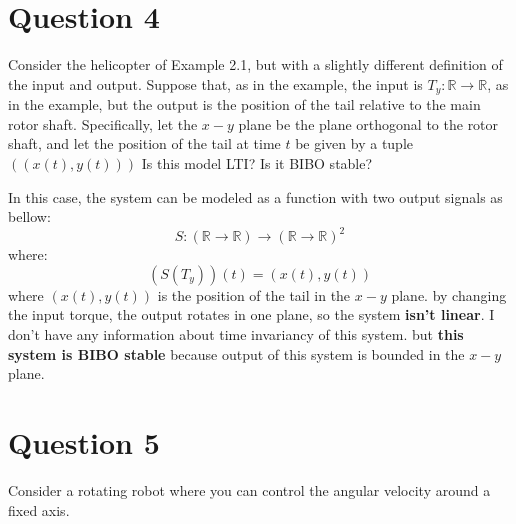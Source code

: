 \documentclass[12pt]{article}
\begin{document}
\vfil
\clearpage












\section{Question 4}
Consider the helicopter of Example 2.1, but with a slightly different definition of
the input and output. Suppose that, as in the example, the input is $T_y: \mathbb{R} \rightarrow \mathbb{R}$, as in the example, but the output is the position of the tail relative to the main rotor shaft. Specifically, let the $x-y$ plane be the plane orthogonal to the rotor shaft, and let the position of the tail at time $t$ be given by a tuple $((x(t), y(t)))$ Is this model LTI? Is it BIBO stable?



\begin{qsolve}[Solution]
	In this case, the system can be modeled as a function with two output signals as bellow:
	$$ S:(\mathbb{R} \rightarrow \mathbb{R}) \rightarrow (\mathbb{R} \rightarrow \mathbb{R})^2 $$
	where:
	$$ (S(T_y))(t)=(x(t), y(t)) $$
	where $(x(t), y(t))$ is the position of the tail in the $x-y$ plane. by changing the input torque, the output rotates in one plane, so the system \textbf{isn't linear}. I don't have any information about time invariancy of this system. but \textbf{this system is BIBO stable} because output of this system is bounded in the $x-y$ plane.
	
\end{qsolve}
\vfil
\clearpage

















\section{Question 5}
Consider a rotating robot where you can control the angular velocity around a fixed
axis.
\end{document}
